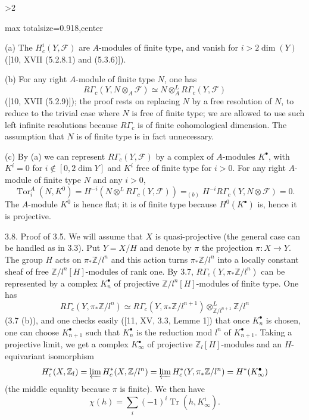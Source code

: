 \documentclass[9pt,twoside]{extarticle}
\newcommand{\EditionPage}[3]{%
  \ifnum#1>2\clearpage\fi
  \pdfbookmark[1]{Printed page #2}{en-folio-#2}%
  \hypertarget{en-physical-#1}{}%
  \noindent\begin{adjustbox}{max totalsize={\textwidth}{0.918\textheight},center}
  \begin{minipage}[t]{\textwidth}
  \fontsize{9.4}{11.1}\selectfont\justifying
  #3
  \end{minipage}
  \end{adjustbox}%
}
\begin{document}
\EditionPage{20}{121}{%
(a) The \(H_c^i(Y,\mathcal F)\) are \(A\)-modules of finite type, and vanish for \(i>2\dim(Y)\) ([10, XVII (5.2.8.1) and (5.3.6)]).\par

(b) For any right \(A\)-module of finite type \(N\), one has \[
R\Gamma_c(Y,N\otimes_A\mathcal F)
\simeq
N\otimes_A^L R\Gamma_c(Y,\mathcal F)
\] ([10, XVII (5.2.9)]); the proof rests on replacing \(N\) by a free resolution of \(N\), to reduce to the trivial case where \(N\) is free of finite type; we are allowed to use such left infinite resolutions because \(R\Gamma_c\) is of finite cohomological dimension. The assumption that \(N\) is of finite type is in fact unnecessary.\par

(c) By (a) we can represent \(R\Gamma_c(Y,\mathcal F)\) by a complex of \(A\)-modules \(K^\bullet\), with \(K^i=0\) for \(i\notin[0,2\dim Y]\) and \(K^i\) free of finite type for \(i>0\). For any right \(A\)-module of finite type \(N\) and any \(i>0\), \[
\operatorname{Tor}_i^A(N,K^0)
=
H^{-i}(N\otimes^L R\Gamma_c(Y,\mathcal F))
\mathrel{=}_{(b)}
H^{-i}R\Gamma_c(Y,N\otimes\mathcal F)
=0.
\] The \(A\)-module \(K^0\) is hence flat; it is of finite type because \(H^0(K^\bullet)\) is, hence it is projective.\par

3.8. Proof of 3.5. We will assume that \(X\) is quasi-projective (the general case can be handled as in 3.3). Put \(Y=X/H\) and denote by \(\pi\) the projection \(\pi:X\to Y\). The group \(H\) acts on \(\pi_*\mathbb Z/l^n\) and this action turns \(\pi_*\mathbb Z/l^n\) into a locally constant sheaf of free \(\mathbb Z/l^n[H]\)-modules of rank one. By 3.7, \(R\Gamma_c(Y,\pi_*\mathbb Z/l^n)\) can be represented by a complex \(K_n^\bullet\) of projective \(\mathbb Z/l^n[H]\)-modules of finite type. One has \[
R\Gamma_c(Y,\pi_*\mathbb Z/l^n)
\simeq
R\Gamma_c(Y,\pi_*\mathbb Z/l^{n+1})
\otimes^L_{\mathbb Z/l^{n+1}}\mathbb Z/l^n
\] (3.7 (b)), and one checks easily ([11, XV, 3.3, Lemme 1]) that once \(K_n^\bullet\) is chosen, one can choose \(K_{n+1}^\bullet\) such that \(K_n^\bullet\) is the reduction mod \(l^n\) of \(K_{n+1}^\bullet\). Taking a projective limit, we get a complex \(K_\infty^\bullet\) of projective \(\mathbb Z_l[H]\)-modules and an \(H\)-equivariant isomorphism \[
H_c^*(X,\mathbb Z_l)
=
\varprojlim H_c^*(X,\mathbb Z/l^n)
=
\varprojlim H_c^*(Y,\pi_*\mathbb Z/l^n)
=
H^*(K_\infty^\bullet)
\] (the middle equality because \(\pi\) is finite). We then have \[
\chi(h)=\sum_i(-1)^i\operatorname{Tr}(h,K_\infty^i).
\]\par

}
\end{document}
